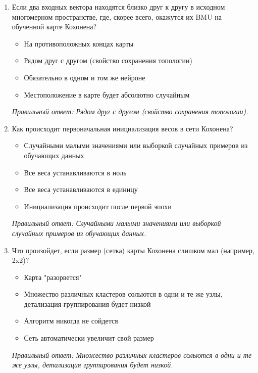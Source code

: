\begin{enumerate}[label=\textbf{\arabic*.}, leftmargin=0pt, itemsep=1.2em]
\item Если два входных вектора находятся близко друг к другу в исходном многомерном пространстве, где, скорее всего, окажутся их BMU на обученной карте Кохонена?
\begin{itemize}[label=$\square$, leftmargin=1.5cm, itemsep=0.2em, topsep=0.3em]
\item На противоположных концах карты
\item Рядом друг с другом (свойство сохранения топологии)
\item Обязательно в одном и том же нейроне
\item Местоположение в карте будет абсолютно случайным
\end{itemize}
{\small\textit{Правильный ответ: Рядом друг с другом (свойство сохранения топологии).}}

\item Как происходит первоначальная инициализация весов в сети Кохонена?
\begin{itemize}[label=$\square$, leftmargin=1.5cm, itemsep=0.2em, topsep=0.3em]
\item Случайными малыми значениями или выборкой случайных примеров из обучающих данных
\item Все веса устанавливаются в ноль
\item Все веса устанавливаются в единицу
\item Инициализация происходит после первой эпохи
\end{itemize}
{\small\textit{Правильный ответ: Случайными малыми значениями или выборкой случайных примеров из обучающих данных.}}

\item Что произойдет, если размер (сетка) карты Кохонена слишком мал (например, 2x2)?
\begin{itemize}[label=$\square$, leftmargin=1.5cm, itemsep=0.2em, topsep=0.3em]
\item Карта "разорвется"
\item Множество различных кластеров сольются в одни и те же узлы, детализация группирования будет низкой
\item Алгоритм никогда не сойдется
\item Сеть автоматически увеличит свой размер
\end{itemize}
{\small\textit{Правильный ответ: Множество различных кластеров сольются в одни и те же узлы, детализация группирования будет низкой.}}


\end{enumerate}

